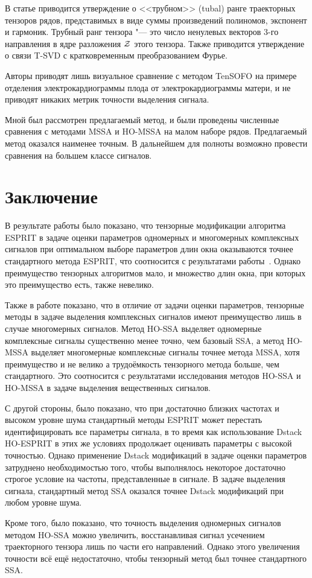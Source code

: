 \documentclass[specialist,
  substylefile=spbu_report.rtx,
subf,href,colorlinks=true, 12pt]{disser}
\theoremstyle{plain}
\theoremstyle{definition}
\theoremstyle{remark}
\begin{document}
В статье приводится утверждение о <<трубном>> (tubal) ранге траекторных
тензоров рядов, представимых в виде суммы произведений полиномов,
экспонент и гармоник.
Трубный ранг тензора "--- это число ненулевых векторов 3-го
направления в ядре разложения $\mathcal{Z}$ этого тензора.
Также приводится утверждение о связи T-SVD с кратковременным
преобразованием Фурье.

Авторы приводят лишь визуальное сравнение с методом TenSOFO на примере отделения
электрокардиограммы плода от электрокардиограммы матери, и не
приводят никаких метрик точности выделения сигнала.

Мной был рассмотрен предлагаемый метод, и были проведены численные
сравнения с методами MSSA и HO-MSSA на малом наборе рядов.
Предлагаемый метод оказался наименее точным.
В дальнейшем для полноты возможно провести сравнения на большем классе сигналов.

\newpage

\section{Заключение}\label{sec:conclusion}
В результате работы было показано, что тензорные модификации
алгоритма \linebreak
ESPRIT в задаче оценки параметров одномерных и многомерных
комплексных сигналов при оптимальном выборе параметров
длин окна оказываются точнее стандартного метода ESPRIT,
что соотносится с результатами работы~\cite{hosvd-hooi-separation}.
Однако преимущество тензорных алгоритмов мало, и множество
длин окна, при которых это преимущество есть, также невелико.

Также в работе показано, что в отличие от задачи
оценки параметров, тензорные методы в задаче выделения комплексных
сигналов имеют преимущество лишь в случае многомерных сигналов.
Метод HO-SSA выделяет одномерные комплексные сигналы существенно менее точно,
чем базовый SSA, а метод HO-MSSA выделяет многомерные комплексные сигналы
точнее метода MSSA, хотя преимущество и не велико а трудоёмкость тензорного
метода больше, чем стандартного.
Это соотносится с результатами исследования методов HO-SSA и
HO-MSSA в задаче выделения вещественных сигналов.

С другой стороны, было показано, что при достаточно близких частотах
и высоком уровне шума стандартный методы ESPRIT может перестать
идентифицировать все параметры сигнала, в то время как использование
Dstack HO-ESPRIT в этих же условиях продолжает
оценивать параметры с высокой точностью.
Однако применение Dstack модификаций в задаче оценки параметров
затруднено необходимостью того, чтобы выполнялось некоторое
достаточно строгое условие на частоты, представленные в сигнале.
В задаче выделения сигнала, стандартный метод SSA оказался точнее
Dstack модификаций при любом уровне шума.

Кроме того, было показано, что точность выделения
одномерных сигналов методом HO-SSA можно увеличить, восстанавливая
сигнал усечением траекторного тензора лишь по части его направлений.
Однако этого увеличения точности всё ещё недостаточно, чтобы
тензорный метод был точнее стандартного SSA.



\end{document}
